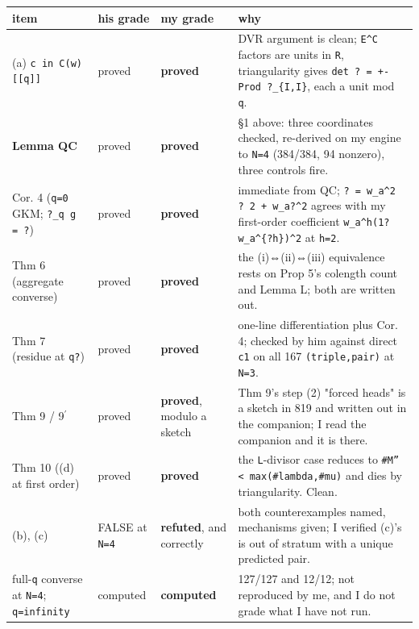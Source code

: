 \documentclass[11pt,a4paper]{article}
\begin{document}
\begin{center}\footnotesize
\begin{tabular}{@{}p{}p{}p{}p{}@{}}
\hline
\textbf{item} & \textbf{his grade} & \textbf{\textbf{my grade}} & \textbf{why}\\ \hline
(a) \mbox{\texttt{c in C(w)[[q]]}} & proved & \textbf{proved} & DVR argument is clean; \mbox{\texttt{E\textasciicircum{}C}} factors are units in \mbox{\texttt{R}}, triangularity gives \mbox{\texttt{det ? = +-Prod ?\_\{I,I\}}}, each a unit mod \mbox{\texttt{q}}.\\
\textbf{Lemma QC} & proved & \textbf{proved} & \S{}1 above: three coordinates checked, re-derived on my engine to \mbox{\texttt{N=4}} (384/384, 94 nonzero), three controls fire.\\
Cor. 4 (\mbox{\texttt{q=0}} GKM; \mbox{\texttt{?\_q g = ?}}) & proved & \textbf{proved} & immediate from QC; \mbox{\texttt{? = w\_a\textasciicircum{}2 ? 2 + w\_a?\textasciicircum{}2}} agrees with my first-order coefficient \mbox{\texttt{w\_a\textasciicircum{}h(1?w\_a\textasciicircum{}\{?h\})\textasciicircum{}2}} at \mbox{\texttt{h=2}}.\\
Thm 6 (aggregate converse) & proved & \textbf{proved} & the (i)⇔(ii)⇔(iii) equivalence rests on Prop 5's colength count and Lemma L; both are written out.\\
Thm 7 (residue at \mbox{\texttt{q?}}) & proved & \textbf{proved} & one-line differentiation plus Cor. 4; checked by him against direct \mbox{\texttt{c1}} on all 167 \mbox{\texttt{(triple,pair)}} at \mbox{\texttt{N=3}}.\\
Thm 9 / 9$^{\prime}$ & proved & \textbf{proved}, modulo a sketch & Thm 9's step (2) "forced heads" is a sketch in 819 and written out in the companion; I read the companion and it is there.\\
Thm 10 ((d) at first order) & proved & \textbf{proved} & the \mbox{\texttt{L}}-divisor case reduces to \mbox{\texttt{\#M'' < max(\#lambda,\#mu)}} and dies by triangularity. Clean.\\
(b), (c) & FALSE at \mbox{\texttt{N=4}} & \textbf{refuted}, and correctly & both counterexamples named, mechanisms given; I verified (c)'s is out of stratum with a unique predicted pair.\\
full-\mbox{\texttt{q}} converse at \mbox{\texttt{N=4}}; \mbox{\texttt{q=infinity}} & computed & \textbf{computed} & 127/127 and 12/12; not reproduced by me, and I do not grade what I have not run.\\

\end{tabular}
\end{center}
\end{document}
